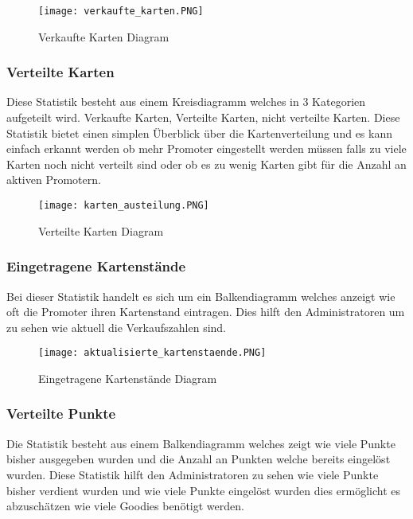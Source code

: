 				\begin{figure}[h]
					\centering
					\texttt{[image: verkaufte\_karten.PNG]}
					\caption{Verkaufte Karten Diagram}
				\end{figure}

			\subsubsection{Verteilte Karten}
				Diese Statistik besteht aus einem Kreisdiagramm welches in 3 Kategorien aufgeteilt wird. Verkaufte Karten, Verteilte Karten, nicht verteilte Karten. Diese Statistik bietet einen simplen Überblick über die Kartenverteilung und es kann einfach erkannt werden ob mehr Promoter eingestellt werden müssen falls zu viele Karten noch nicht verteilt sind oder ob es zu wenig Karten gibt für die Anzahl an aktiven Promotern. 
				
				\begin{figure}[h]
					\centering
					\texttt{[image: karten\_austeilung.PNG]}
					\caption{Verteilte Karten Diagram}
				\end{figure}

			\subsubsection{Eingetragene Kartenstände}
				Bei dieser Statistik handelt es sich um ein Balkendiagramm welches anzeigt wie oft die Promoter ihren Kartenstand eintragen. Dies hilft den Administratoren um zu sehen wie aktuell die Verkaufszahlen sind.
				
				\begin{figure}[h]
					\centering
					\texttt{[image: aktualisierte\_kartenstaende.PNG]}
					\caption{Eingetragene Kartenstände Diagram}
				\end{figure}

			\subsubsection{Verteilte Punkte}
				Die Statistik besteht aus einem Balkendiagramm welches zeigt wie viele Punkte bisher ausgegeben wurden und die Anzahl an Punkten welche bereits eingelöst wurden. Diese Statistik hilft den Administratoren zu sehen wie viele Punkte bisher verdient wurden und wie viele Punkte eingelöst wurden dies ermöglicht es abzuschätzen wie viele Goodies benötigt werden. 
				
